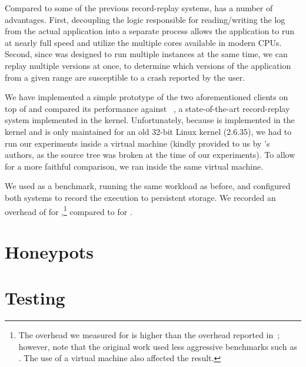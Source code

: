 Compared to some of the previous record-replay systems, \varan has a
number of advantages. First, decoupling the logic responsible for
reading/writing the log from the actual application into a separate
process allows the application to run at nearly full speed and utilize
the multiple cores available in modern CPUs.  Second, since \varan was
designed to run multiple instances at the same time, we can replay
multiple versions at once, \eg to determine which versions of the
application from a given range are susceptible to a crash reported by
the user.

We have implemented a simple prototype of the two aforementioned
clients on top of \varan and compared its performance against
\scribe~\cite{scribe}, a state-of-the-art record-replay system
implemented in the kernel.  Unfortunately, because \scribe is
implemented in the kernel and is only maintained for an old 32-bit
Linux kernel (2.6.35), we had to run our experiments inside a virtual
machine (kindly provided to us by \scribe's authors, as the source tree
was broken at the time of our experiments). 
To allow for a more faithful comparison, we ran \varan inside the same
virtual machine.

We used \redis as a benchmark, running the same workload as before,
and configured both systems to record the execution to persistent
storage.  We recorded an overhead of \redisRROvhScribe for
\scribe,\footnote{The overhead we measured for \scribe is higher than
  the overhead reported in~\cite{scribe}; however, note that the original
  work used less aggressive benchmarks such as \httpd.  The use of a
  virtual machine also affected the result.}  compared to
\redisRROvhNx for \varan.


\section{Honeypots}
\section{Testing}
